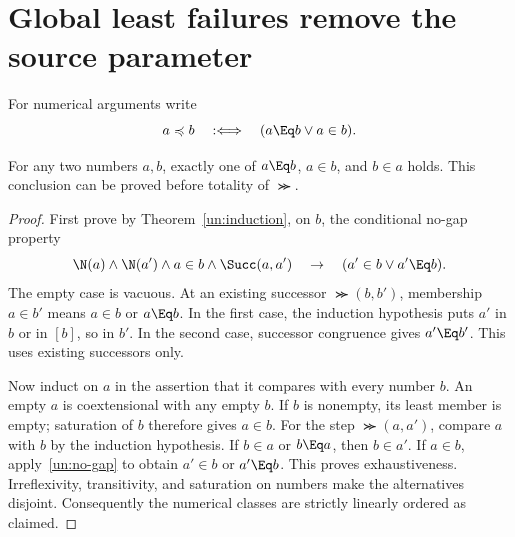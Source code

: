 \section{Global least failures remove the source parameter}
\label{un:minimization}

For numerical arguments write
\[
                 a\preccurlyeq b\quad:\Longleftrightarrow\quad
                            (a\Eq b\lor a\in b).
\]

\begin{lemma}
\label{un:comparison}
For any two numbers $a,b$, exactly one of
$a\Eq b$, $a\in b$, and $b\in a$ holds. This conclusion can be
proved before totality of $\Succ$.
\end{lemma}
\begin{proof}
First prove by Theorem~\ref{un:induction}, on $b$, the conditional
no-gap property
\begin{equation}\label{un:no-gap}
 \N(a)\land\N(a')\land a\in b\land\Succ(a,a')
       \quad\to\quad(a'\in b\lor a'\Eq b).
\end{equation}
The empty case is vacuous. At an existing successor $\Succ(b,b')$,
membership $a\in b'$ means $a\in b$ or $a\Eq b$. In the first case,
the induction hypothesis puts $a'$ in $b$ or in $[b]$, so in $b'$.
In the second case, successor congruence gives $a'\Eq b'$.
This uses existing successors only.

Now induct on $a$ in the assertion that it compares with every number
$b$. An empty $a$ is coextensional with any empty $b$. If $b$ is
nonempty, its least member is empty; saturation of $b$ therefore gives
$a\in b$. For the step $\Succ(a,a')$, compare $a$ with $b$ by the
induction hypothesis. If $b\in a$ or $b\Eq a$, then $b\in a'$.
If $a\in b$, apply~\eqref{un:no-gap} to obtain $a'\in b$ or
$a'\Eq b$. This proves exhaustiveness. Irreflexivity, transitivity,
and saturation on numbers make the alternatives disjoint. Consequently
the numerical classes are strictly linearly ordered as claimed.
\end{proof}

